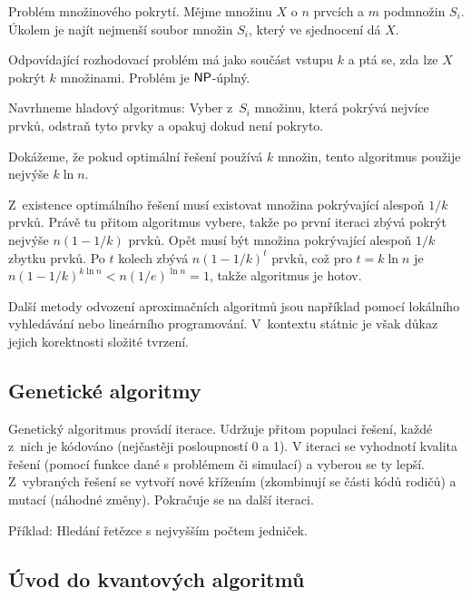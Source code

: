 \begin{example}

    Problém množinového pokrytí. Mějme množinu $X$ o $n$ prvcích
    a $m$ podmnožin $S_i$. Úkolem je najít nejmenší soubor množin $S_i$,
    který ve sjednocení dá $X$.

    Odpovídající rozhodovací problém má jako součást vstupu $k$ a ptá
    se, zda lze $X$ pokrýt $k$ množinami. Problém je ${\mathsf{NP}}$-úplný.

    Navrhneme hladový algoritmus: Vyber z~$S_i$ množinu, která pokrývá
    nejvíce prvků, odstraň tyto prvky a opakuj dokud není pokryto.

    Dokážeme, že pokud optimální řešení používá $k$ množin, tento
    algoritmus použije nejvýše $k \ln n$.

    Z~existence optimálního řešení musí existovat množina pokrývající alespoň
    $1/k$ prvků. Právě tu přitom algoritmus vybere, takže po první
    iteraci zbývá pokrýt nejvýše $n(1 - 1/k)$ prvků.
    Opět musí být množina pokrývající alespoň $1/k$ zbytku prvků.
    Po $t$ kolech zbývá $n(1-1/k)^t$ prvků,
    což pro $t = k \ln n$ je $n(1-1/k)^{k \ln n} < n(1/e)^{\ln n} = 1$,
    takže algoritmus je hotov.
\end{example}

Další metody odvození aproximačních algoritmů jsou například pomocí
lokálního vyhledávání nebo lineárního programování.
V~kontextu státnic je však důkaz jejich korektnosti složité tvrzení.

\subsection{Genetické algoritmy}

Genetický algoritmus provádí iterace. Udržuje přitom populaci řešení,
každé z~nich je kódováno (nejčastěji posloupností 0 a 1). V iteraci se
vyhodnotí kvalita řešení (pomocí funkce dané s problémem či simulací)
a vyberou se ty lepší. Z~vybraných řešení se vytvoří nové křížením
(zkombinují se části kódů rodičů) a mutací (náhodné změny). Pokračuje se
na další iteraci.

Příklad: Hledání řetězce s nejvyšším počtem jedniček.

\subsection{Úvod do kvantových algoritmů}


